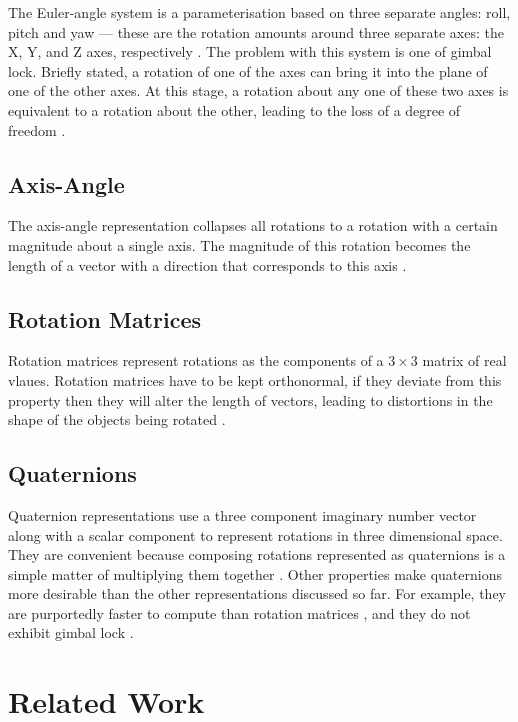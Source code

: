 \documentclass{acm_proc_article-sp}
\begin{document}
The Euler-angle system is a parameterisation based on three separate angles: roll, pitch and yaw --- these are the rotation amounts around three separate axes: the X, Y, and Z axes, respectively \cite{diebel06}.
The problem with this system is one of gimbal lock.
Briefly stated, a rotation of one of the axes can bring it into the plane of one of the other axes.
At this stage, a rotation about any one of these two axes is equivalent to a rotation about the other, leading to the loss of a degree of freedom \cite{pletinckx89}.

\subsection{Axis-Angle}

The axis-angle representation collapses all rotations to a rotation with a certain magnitude about a single axis.
The magnitude of this rotation becomes the length of a vector with a direction that corresponds to this axis \cite{diebel06}.

\subsection{Rotation Matrices}

Rotation matrices represent rotations as the components of a $3 \times 3$ matrix of real vlaues.
Rotation matrices have to be kept orthonormal, if they deviate from this property then they will alter the length of vectors, leading to distortions in the shape of the objects being rotated \cite{diebel06}.

\subsection{Quaternions}

Quaternion representations use a three component imaginary number vector along with a scalar component to represent rotations in three dimensional space.
They are convenient because composing rotations represented as quaternions is a simple matter of multiplying them together \cite{schoemake85}.
Other properties make quaternions more desirable than the other representations discussed so far.
For example, they are purportedly faster to compute than rotation matrices \cite{taylor79}, and they do not exhibit gimbal lock \cite{schoemake85}.

\section{Related Work}
\end{document}
